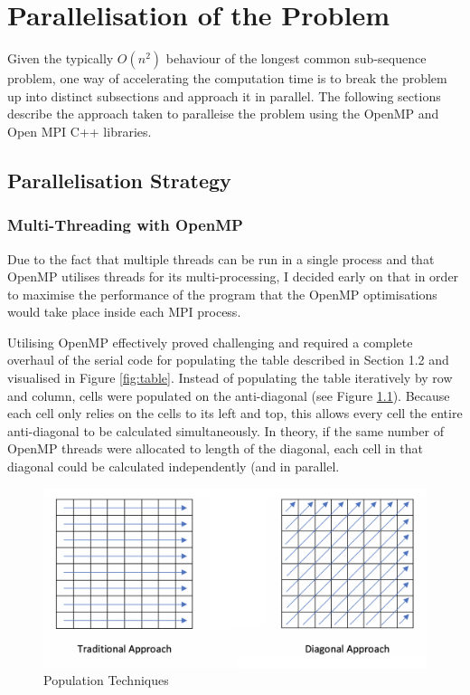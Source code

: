 \chapter{Parallelisation of the Problem}
Given the typically $O(n^2)$ behaviour of the longest common sub-sequence problem, one way of accelerating the computation time is to break the problem up into distinct subsections and approach it in parallel. The following sections describe the approach taken to paralleise the problem using the OpenMP and Open MPI C++ libraries.

\section{Parallelisation Strategy}

\subsection{Multi-Threading with OpenMP}
Due to the fact that multiple threads can be run in a single process and that OpenMP utilises threads for its multi-processing, I decided early on that in order to maximise the performance of the program that the OpenMP optimisations would take place inside each MPI process.

Utilising OpenMP effectively proved challenging and required a complete overhaul of the serial code for populating the table described in Section 1.2 and visualised in Figure \ref{fig:table}. Instead of populating the table iteratively by row and column, cells were populated on the anti-diagonal (see Figure \ref{fig:techniques}). Because each cell only relies on the cells to its left and top, this allows every cell the entire anti-diagonal to be calculated simultaneously. In theory, if the same number of OpenMP threads were allocated to length of the diagonal, each cell in that diagonal could be calculated independently (and in parallel.

\begin{figure}[h]
\label{fig:techniques}
\centering
\includegraphics[width=12cm]{img/diagonal.png}
\caption{Population Techniques}
\end{figure}

